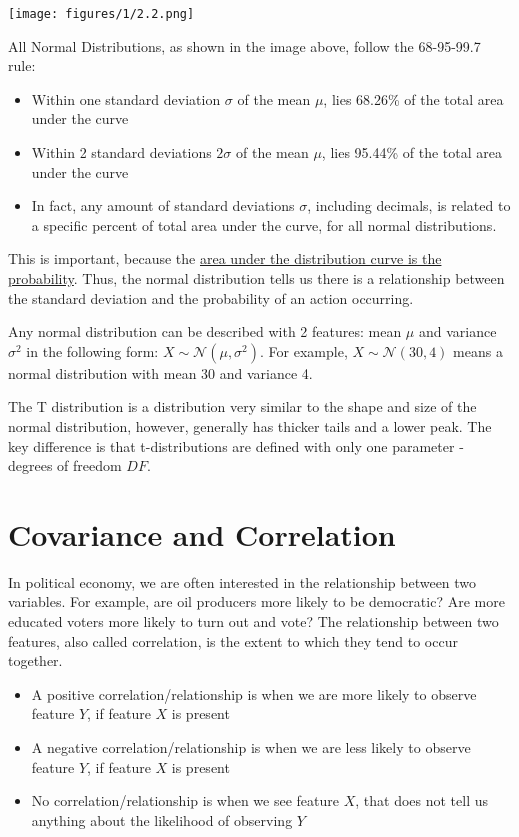 \documentclass[
  a4paper,
]{report}
\begin{document}
\begin{center}
\texttt{[image: figures/1/2.2.png]}
\end{center}

All Normal Distributions, as shown in the image above, follow the
68-95-99.7 rule:

\begin{itemize}
\item
  Within one standard deviation \(\sigma\) of the mean \(\mu\), lies
  68.26\% of the total area under the curve
\item
  Within 2 standard deviations \(2 \sigma\) of the mean \(\mu\), lies
  95.44\% of the total area under the curve
\item
  In fact, any amount of standard deviations \(\sigma\), including
  decimals, is related to a specific percent of total area under the
  curve, for all normal distributions.
\end{itemize}

This is important, because the \ul{area under the distribution curve is
the probability}. Thus, the normal distribution tells us there is a
relationship between the standard deviation and the probability of an
action occurring.

Any normal distribution can be described with 2 features: mean \(\mu\)
and variance \(\sigma^2\) in the following form:
\(X \sim \mathcal{N}(\mu, \sigma^2)\). For example,
\(X \sim \mathcal{N} (30, 4)\) means a normal distribution with mean 30
and variance 4.

The T distribution is a distribution very similar to the shape and size
of the normal distribution, however, generally has thicker tails and a
lower peak. The key difference is that t-distributions are defined with
only one parameter - degrees of freedom \(DF\).

\section{Covariance and Correlation}\label{covariance-and-correlation}

In political economy, we are often interested in the relationship
between two variables. For example, are oil producers more likely to be
democratic? Are more educated voters more likely to turn out and vote?
The relationship between two features, also called correlation, is the
extent to which they tend to occur together.

\begin{itemize}
\item
  A positive correlation/relationship is when we are more likely to
  observe feature \(Y\), if feature \(X\) is present
\item
  A negative correlation/relationship is when we are less likely to
  observe feature \(Y\), if feature \(X\) is present
\item
  No correlation/relationship is when we see feature \(X\), that does
  not tell us anything about the likelihood of observing \(Y\)
\end{itemize}
\end{document}

